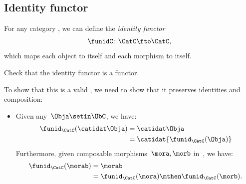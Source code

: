 \subsection{Identity functor}
\label{sec:identity-functor}

\begin{definition}\label{def:identity-semifunctor}
    For any category \CatC, we can define the \emph{identity functor}
    \begin{equation}
        \funidC \colon \CatC \fto \CatC,
    \end{equation}
    which maps each object to itself and each morphism to itself.
\end{definition}

\begin{exercise}
    Check that the identity functor is a functor.
\end{exercise}
\begin{solution}
    To show that this is a valid , we need to show that it preserves identities and composition:
    \begin{itemize}
        \item Given any~$\Obja \setin \ObC$, we have:
              \begin{equation}
                  \begin{aligned}
                      \funid_{\CatC}(\catidat\Obja) & =\catidat\Obja \\
                                                    & =\catidat{\funid_{\CatC}(\Obja)}
                  \end{aligned}
              \end{equation}
              Furthermore, given composable morphisms~$\mora,\morb$ in~\CatC, we have:
              \begin{equation}
                  \begin{aligned}
                      \funid_{\CatC}(\morab) & =\morab \\
                                             & =\funid_{\CatC}(\mora)\mthen \funid_{\CatC} (\morb).
                  \end{aligned}
              \end{equation}
    \end{itemize}
\end{solution}



